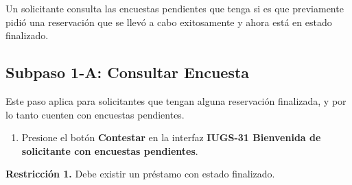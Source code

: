 Un solicitante consulta las encuestas pendientes que tenga si es que previamente
pidió una reservación que se llevó a cabo exitosamente y ahora está en estado finalizado.

\subsection{Subpaso 1-A: Consultar Encuesta}
Este paso aplica para solicitantes que tengan alguna reservación finalizada, y por lo tanto cuenten
con encuestas pendientes.
\begin{enumerate}
	\item Presione el botón \textbf{Contestar} en la interfaz
    \textbf{IUGS-31 Bienvenida de solicitante con encuestas pendientes}.
\end{enumerate}

\textbf{Restricción 1.} Debe existir un préstamo con estado finalizado.
